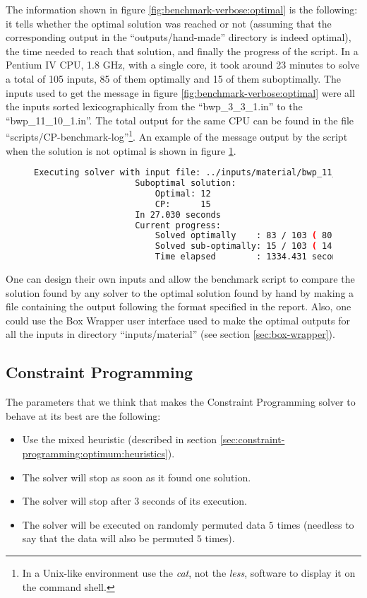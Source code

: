 The information shown in figure \ref{fig:benchmark-verbose:optimal} is the following:
it tells whether the optimal solution was reached or not (assuming that the
corresponding output in the ``outputs/hand-made'' directory is indeed optimal),
the time needed to reach that solution, and finally the progress of the script.
In a Pentium IV CPU, 1.8 GHz, with a single core, it took around 23 minutes to
solve a total of 105 inputs, 85 of them optimally and 15 of them suboptimally.
The inputs used to get the message in figure \ref{fig:benchmark-verbose:optimal} were
all the inputs sorted lexicographically from the ``bwp\_3\_3\_1.in'' to the
``bwp\_11\_10\_1.in''. The total output for the same CPU can be found
in the file ``scripts/CP-benchmark-log''\footnote{In a Unix-like environment use
the \textit{cat}, not the \textit{less}, software to display it on the command shell.}.
An example of the message output by the script when the solution is not optimal is
shown in figure \ref{fig:benchmark-verbose:suboptimal}.

\begin{figure}[H]
\centering
\begin{lstlisting}[language=bash]
				Executing solver with input file: ../inputs/material/bwp_11_8_1.in
					Suboptimal solution:
						Optimal: 12
						CP:      15
					In 27.030 seconds
					Current progress:
						Solved optimally    : 83 / 103 ( 80.58% )
						Solved sub-optimally: 15 / 103 ( 14.56% )
						Time elapsed        : 1334.431 seconds
\end{lstlisting}
\label{fig:benchmark-verbose:suboptimal}
\end{figure}

\hfill

One can design their own inputs and allow the benchmark script to compare
the solution found by any solver to the optimal solution found by hand by
making a file containing the output following the format specified in the
report. Also, one could use the Box Wrapper user interface used to make the
optimal outputs for all the inputs in directory ``inputs/material'' (see
section \ref{sec:box-wrapper}).

\subsection{Constraint Programming}
\label{sec:benchmarking:constraint-programming}

The parameters that we think that makes the Constraint Programming solver to behave
at its best are the following:
\begin{itemize}
	\item Use the mixed heuristic (described in section \ref{sec:constraint-programming:optimum:heuristics}).
	\item The solver will stop as soon as it found one solution.
	\item The solver will stop after 3 seconds of its execution.
	\item The solver will be executed on randomly permuted data $5$ times (needless to
	say that the data will also be permuted $5$ times).
\end{itemize}
